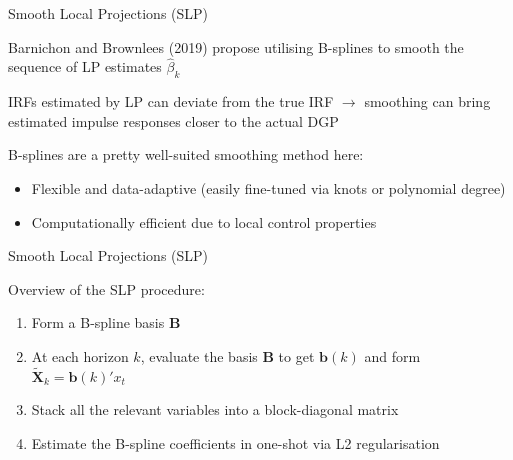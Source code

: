 \documentclass{beamer}
\begin{document}
\begin{frame}{Smooth Local Projections (SLP)}
   
	Barnichon and Brownlees (2019) propose utilising B-splines to smooth the sequence of LP
    estimates $\hat{\beta}_k$ \bigskip

	IRFs estimated by LP can deviate from the true IRF $\to$ smoothing can bring estimated
    impulse responses closer to the actual DGP \bigskip

	B-splines are a pretty well-suited smoothing method here:

	\begin{itemize}
		
		\item Flexible and data-adaptive (easily fine-tuned via knots or polynomial degree)
		\item Computationally efficient due to local control properties 

	\end{itemize}

\end{frame}

\begin{frame}{Smooth Local Projections (SLP)}

    Overview of the SLP procedure:

    \begin{enumerate}
    
        \item Form a B-spline basis $\mathbf{B}$

        \item At each horizon $k$, evaluate the basis $\mathbf{B}$ to get $\mathbf{b}(k)$ and form $\tilde{\mathbf{X}}_k = \mathbf{b}(k)' x_t$

        \item Stack all the relevant variables into a block-diagonal matrix

        \item Estimate the B-spline coefficients in one-shot via L2 regularisation

    \end{enumerate}

\end{frame}
\end{document}
